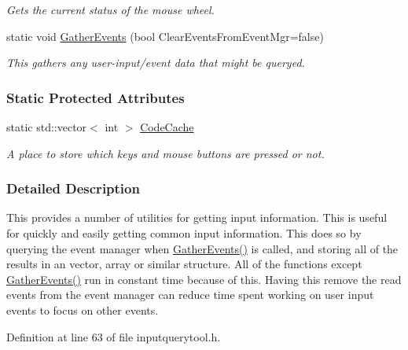 \begin{DoxyCompactItemize}
\begin{DoxyCompactList}\small\item\em Gets the current status of the mouse wheel. \item\end{DoxyCompactList}\item 
static void \hyperlink{classphys_1_1InputQueryTool_a9779d812418f1fddb0880df0c607242b}{GatherEvents} (bool ClearEventsFromEventMgr=false)
\begin{DoxyCompactList}\small\item\em This gathers any user-\/input/event data that might be queryed. \item\end{DoxyCompactList}\end{DoxyCompactItemize}
\subsubsection*{Static Protected Attributes}
\begin{DoxyCompactItemize}
\item 
static std::vector$<$ int $>$ \hyperlink{classphys_1_1InputQueryTool_a609970101c63859e1f9fb3ff81ca1797}{CodeCache}
\begin{DoxyCompactList}\small\item\em A place to store which keys and mouse buttons are pressed or not. \item\end{DoxyCompactList}\end{DoxyCompactItemize}


\subsubsection{Detailed Description}
This provides a number of utilities for getting input information. This is useful for quickly and easily getting common input information. This does so by querying the event manager when \hyperlink{classphys_1_1InputQueryTool_a9779d812418f1fddb0880df0c607242b}{GatherEvents()} is called, and storing all of the results in an vector, array or similar structure. All of the functions except \hyperlink{classphys_1_1InputQueryTool_a9779d812418f1fddb0880df0c607242b}{GatherEvents()} run in constant time because of this. Having this remove the read events from the event manager can reduce time spent working on user input events to focus on other events. 

Definition at line 63 of file inputquerytool.h.



